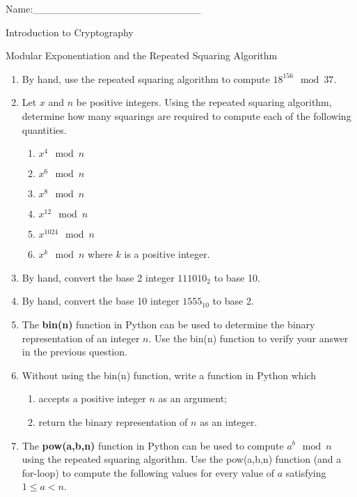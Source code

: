 \documentclass[12pt]{amsart}
\theoremstyle{definition}
\theoremstyle{remark}
\numberwithin{equation}{section}
\begin{document}
\begin{flushright}
Name:\_\_\_\_\_\_\_\_\_\_\_\_\_\_\_\_\_\_\_\_\_\_\_
\end{flushright}
\vspace{10pt}
\begin{center}
Introduction to Cryptography

Modular Exponentiation and the Repeated Squaring Algorithm
\end{center}



\begin{enumerate}
\item By hand, use the repeated squaring algorithm to compute $18^{156}\mod 37$.
\item Let $x$ and $n$ be positive integers. Using the repeated squaring algorithm, determine how many squarings are required to compute each of the following quantities.
\begin{enumerate}
\item $x^4\mod n$
\item $x^6\mod n$
\item $x^8\mod n$
\item $x^{12}\mod n$
\item $x^{1024}\mod n$
\item $x^k\mod n$ where $k$ is a positive integer.
\end{enumerate}
\item By hand, convert the base 2 integer $111010_{2}$ to base 10. 
\item By hand, convert the base 10 integer $1555_{10}$ to base 2.
\item The {\bf bin(n)} function in Python can be used to determine the binary representation of an integer $n$. Use the bin(n) function to verify your answer in the previous question. 
\item Without using the bin(n) function, write a function in Python which 
\begin{enumerate}
\item accepts a positive integer $n$ as an argument;
\item return the binary representation of $n$ as an integer.
\end{enumerate}
\item The {\bf pow(a,b,n)} function in Python can be used to compute $a^b\mod n$ using the repeated squaring algorithm. Use the pow(a,b,n) function (and a for-loop) to compute the following values for every value of $a$ satisfying $1\leq a< n$.
\begin{enumerate}

\end{enumerate}
\end{enumerate}
\end{document}
